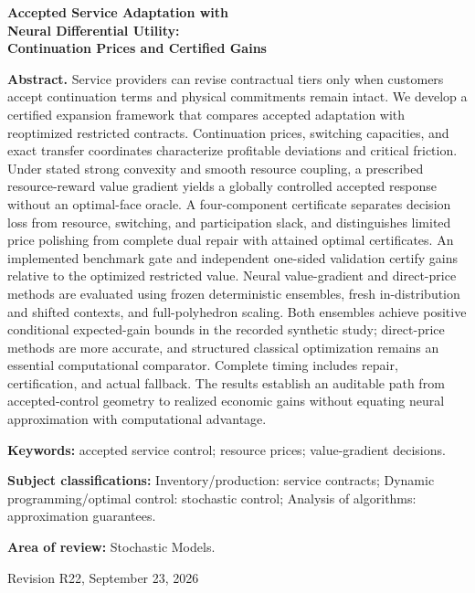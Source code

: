 \documentclass[11pt,letterpaper]{article}
\theoremstyle{definition}
\newcommand{\1}{\mathbf 1}
\begin{document}
\begin{titlepage}\centering
{\Large\bfseries Accepted Service Adaptation with\\ Neural Differential Utility:\\ Continuation Prices and Certified Gains\par}
\vspace{.3in}{Anonymous manuscript for Operations Research\par}\vspace{.25in}
\begin{minipage}{\textwidth}
\textbf{Abstract.}
Service providers can revise contractual tiers only when customers accept continuation terms and physical commitments remain intact. We develop a certified expansion framework that compares accepted adaptation with reoptimized restricted contracts. Continuation prices, switching capacities, and exact transfer coordinates characterize profitable deviations and critical friction. Under stated strong convexity and smooth resource coupling, a prescribed resource-reward value gradient yields a globally controlled accepted response without an optimal-face oracle. A four-component certificate separates decision loss from resource, switching, and participation slack, and distinguishes limited price polishing from complete dual repair with attained optimal certificates. An implemented benchmark gate and independent one-sided validation certify gains relative to the optimized restricted value. Neural value-gradient and direct-price methods are evaluated using frozen deterministic ensembles, fresh in-distribution and shifted contexts, and full-polyhedron scaling. Both ensembles achieve positive conditional expected-gain bounds in the recorded synthetic study; direct-price methods are more accurate, and structured classical optimization remains an essential computational comparator. Complete timing includes repair, certification, and actual fallback. The results establish an auditable path from accepted-control geometry to realized economic gains without equating neural approximation with computational advantage.
\par\vspace{.16in}\textbf{Keywords:} accepted service control; resource prices; value-gradient decisions.
\par\vspace{.10in}\textbf{Subject classifications:} Inventory/production: service contracts; Dynamic programming/optimal control: stochastic control; Analysis of algorithms: approximation guarantees.
\par\vspace{.10in}\textbf{Area of review:} Stochastic Models.
\end{minipage}\vfill{Revision R22, September 23, 2026\par}\end{titlepage}
\end{document}
